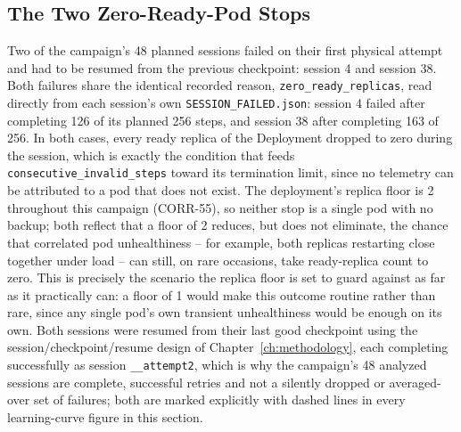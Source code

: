\subsection{The Two Zero-Ready-Pod Stops}
\label{sec:zero-ready-stops}

Two of the campaign's 48 planned sessions failed on their first physical
attempt and had to be resumed from the previous checkpoint: session 4 and
session 38. Both failures share the identical recorded reason,
\texttt{zero\_\allowbreak ready\_\allowbreak replicas}, read directly from each session's own
\texttt{SESSION\_\allowbreak FAILED.json}: session 4 failed after completing 126 of
its planned 256 steps, and session 38 after completing 163 of 256. In both
cases, every ready replica of the Deployment dropped to zero during the
session, which is exactly the condition that feeds
\texttt{consecutive\_\allowbreak invalid\_\allowbreak steps} toward its termination limit, since
no telemetry can be attributed to a pod that does not exist. The
deployment's replica floor is 2 throughout this campaign (CORR-55), so
neither stop is a single pod with no backup; both reflect that a floor of 2
reduces, but does not eliminate, the chance that correlated pod
unhealthiness -- for example, both replicas restarting close together under
load -- can still, on rare occasions, take ready-replica count to zero.
This is precisely the scenario the replica floor is set to guard against as
far as it practically can: a floor of 1 would make this outcome routine
rather than rare, since any single pod's own transient unhealthiness would
be enough on its own. Both sessions were resumed from their last good
checkpoint using the session/checkpoint/resume design of
Chapter~\ref{ch:methodology}, each completing successfully as session
\texttt{\_\allowbreak \_\allowbreak attempt2}, which is why the campaign's 48 analyzed sessions are
complete, successful retries and not a silently dropped or averaged-over
set of failures; both are marked explicitly with dashed lines in every
learning-curve figure in this section.

